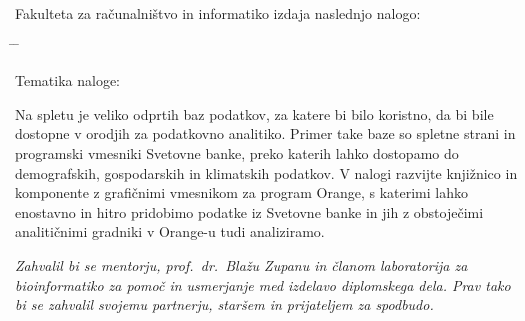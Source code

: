 \documentclass[a4paper, 12pt]{book}
\newcommand{\clearemptydoublepage}{\newpage{\pagestyle{empty}\cleardoublepage}}
\begin{document}
\noindent
Fakulteta za računalništvo in informatiko izdaja naslednjo nalogo:
\medskip
\begin{tabbing}
\hspace{32mm}\= \hspace{6cm} \= \kill




Tematika naloge:
\end{tabbing}
Na spletu je veliko odprtih baz podatkov, za katere bi bilo koristno, da bi bile dostopne v orodjih za podatkovno analitiko. Primer take baze so spletne strani in programski vmesniki Svetovne banke, preko katerih lahko dostopamo do demografskih, gospodarskih in klimatskih podatkov. V nalogi razvijte knjižnico in komponente z grafičnimi vmesnikom za program Orange, s katerimi lahko enostavno in hitro pridobimo podatke iz Svetovne banke in jih z obstoječimi analitičnimi gradniki v Orange-u tudi analiziramo.
\vspace{15mm}






\vspace{2cm}

\clearemptydoublepage

\thispagestyle{empty}\mbox{}\vfill\null\it%
Zahvalil bi se mentorju, prof.\ dr.\ Blažu Zupanu in članom laboratorija za 
bioinformatiko za pomoč in usmerjanje med izdelavo diplomskega dela. 
Prav tako bi se zahvalil svojemu partnerju, staršem in prijateljem za
spodbudo.
\rm\normalfont

\clearemptydoublepage

%

\pagestyle{empty}
\def\thepage{}%
\tableofcontents{}


\clearemptydoublepage

\end{document}
